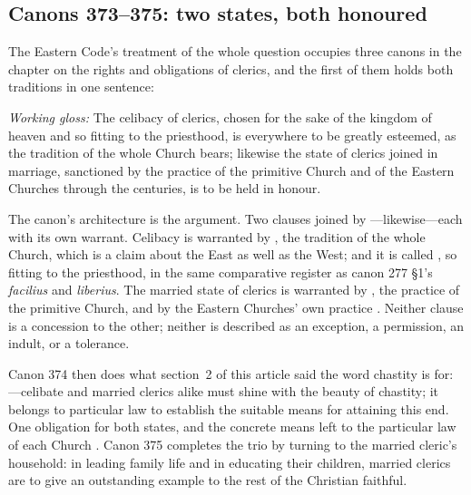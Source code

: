 \subsection{Canons 373--375: two states, both honoured}

The Eastern Code's treatment of the whole question occupies three canons in the chapter on the rights and obligations of clerics, and the first of them holds both traditions in one sentence:

\begin{studyframe}

\emph{Working gloss:} The celibacy of clerics, chosen for the sake of the kingdom of heaven and so fitting to the priesthood, is everywhere to be greatly esteemed, as the tradition of the whole Church bears; likewise the state of clerics joined in marriage, sanctioned by the practice of the primitive Church and of the Eastern Churches through the centuries, is to be held in honour.
\end{studyframe}

The canon's architecture is the argument. Two clauses joined by ---likewise---each with its own warrant. Celibacy is warranted by , the tradition of the whole Church, which is a claim about the East as well as the West; and it is called , so fitting to the priesthood, in the same comparative register as canon 277 §1's \emph{facilius} and \emph{liberius}. The married state of clerics is warranted by , the practice of the primitive Church, and by the Eastern Churches' own practice . Neither clause is a concession to the other; neither is described as an exception, a permission, an indult, or a tolerance.

Canon 374 then does what section~2 of this article said the word chastity is for: ---celibate and married clerics alike must shine with the beauty of chastity; it belongs to particular law to establish the suitable means for attaining this end. One obligation for both states, and the concrete means left to the particular law of each Church . Canon 375 completes the trio by turning to the married cleric's household: in leading family life and in educating their children, married clerics are to give an outstanding example to the rest of the Christian faithful.

